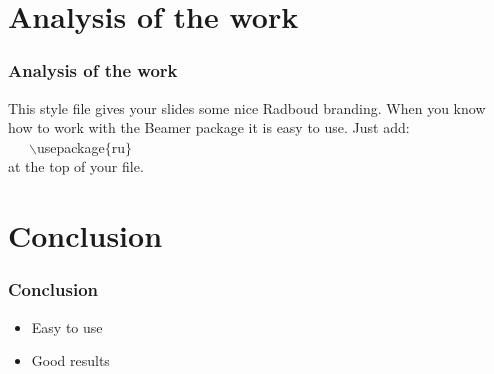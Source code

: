 \documentclass{beamer}
\begin{document}
\section{Analysis of the work}

\begin{frame}
	  \frametitle{Analysis of the work}

	    This style file gives your slides some nice Radboud branding.
	    When you know how to work with the Beamer package it is easy to use.
	    Just add:\\ ~~~$\backslash$usepackage$\{$ru$\}$ \\ at the top of your file.
\end{frame}

\section{Conclusion}

\begin{frame}
	  \frametitle{Conclusion}

	  \begin{itemize}
	  	\item Easy to use
		\item Good results
	  \end{itemize}
\end{frame}
\end{document}
